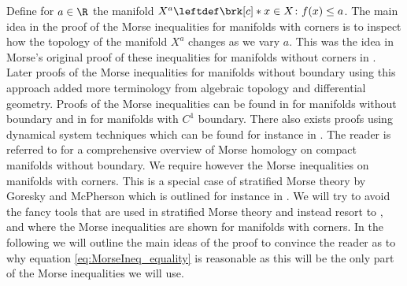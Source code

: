 Define for $a\in\R$ the manifold $X^a\leftdef\brk[c]*{x\in X\colon f(x)\leq a}$.
The main idea in the proof of the Morse inequalities for manifolds with corners is to inspect how the topology of the manifold $X^a$ changes as we vary $a$.
This was the idea in Morse's original proof of these inequalities for manifolds without corners in \cite{Morse1925}.
Later proofs of the Morse inequalities for manifolds without boundary using this approach added more terminology from algebraic topology and differential geometry.
Proofs of the Morse inequalities can be found in \cite[§5]{Milnor1963} for manifolds without boundary and 
in \cite[Theorem 10.2']{Morse1969} for manifolds with $C^1$ boundary.
There also exists proofs using dynamical system techniques
which can be found for instance in \cite{Smale1960}.
The reader is referred to \cite{Banyaga2004} for a comprehensive overview of Morse homology
on compact manifolds without boundary.
We require however the Morse inequalities on manifolds with corners.
This is a special case of stratified Morse theory by Goresky and McPherson which is outlined for instance in \cite[§5.5]{Cisneros2020}.
We will try to avoid the fancy tools that are used in stratified Morse theory and instead
resort to \cite{Braess1974}, \cite{Agrach1991} and \cite{Handron2002} where the Morse inequalities are shown for
manifolds with corners.
In the following we will outline the main ideas of the proof to convince the reader
as to why equation \eqref{eq:MorseIneq_equality} is reasonable as this will be the only part of the 
Morse inequalities we will use.
% 
